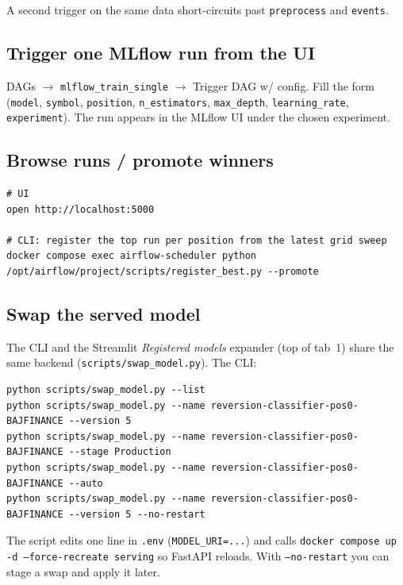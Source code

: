 \documentclass[11pt,a4paper]{article}
\begin{document}
A second trigger on the same data short-circuits past \texttt{preprocess} and \texttt{events}.

\subsection{Trigger one MLflow run from the UI}

DAGs $\to$ \texttt{mlflow\_train\_single} $\to$ Trigger DAG w/ config. Fill the form (\texttt{model}, \texttt{symbol}, \texttt{position}, \texttt{n\_estimators}, \texttt{max\_depth}, \texttt{learning\_rate}, \texttt{experiment}). The run appears in the MLflow UI under the chosen experiment.

\subsection{Browse runs / promote winners}

\begin{lstlisting}[style=bashstyle]
# UI
open http://localhost:5000

# CLI: register the top run per position from the latest grid sweep
docker compose exec airflow-scheduler python /opt/airflow/project/scripts/register_best.py --promote
\end{lstlisting}

\subsection{Swap the served model}

The CLI and the Streamlit \emph{Registered models} expander (top of tab~1) share the same backend (\texttt{scripts/swap\_model.py}). The CLI:

\begin{lstlisting}[style=bashstyle]
python scripts/swap_model.py --list
python scripts/swap_model.py --name reversion-classifier-pos0-BAJFINANCE --version 5
python scripts/swap_model.py --name reversion-classifier-pos0-BAJFINANCE --stage Production
python scripts/swap_model.py --name reversion-classifier-pos0-BAJFINANCE --auto
python scripts/swap_model.py --name reversion-classifier-pos0-BAJFINANCE --version 5 --no-restart
\end{lstlisting}

The script edits one line in \texttt{.env} (\texttt{MODEL\_URI=...}) and calls \texttt{docker compose up -d --force-recreate serving} so FastAPI reloads. With \texttt{--no-restart} you can stage a swap and apply it later.
\end{document}
